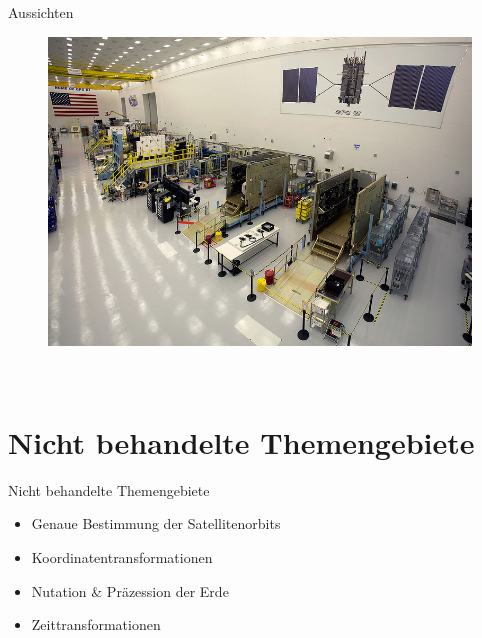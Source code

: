 \begin{frame}{Aussichten}
    \begin{figure}
        \centering
        \includegraphics[height=0.85\textheight]{images/gps-3-construction.jpg}
    \end{figure}
    ~
\end{frame}

\section{Nicht behandelte Themengebiete}
\begin{frame}{Nicht behandelte Themengebiete}
    \begin{itemize}
        \item Genaue Bestimmung der Satellitenorbits
        \item Koordinatentransformationen
        \item Nutation \& Präzession der Erde
        \item Zeittransformationen
    \end{itemize}
\end{frame}

